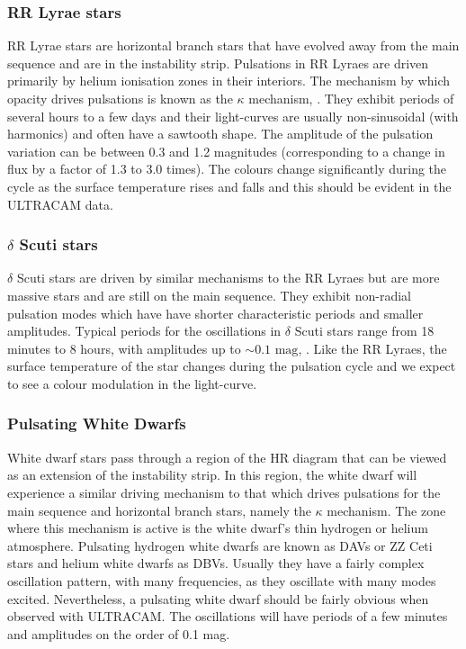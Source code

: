 \subsubsection{RR Lyrae stars}
RR Lyrae stars are horizontal branch stars that have evolved away from the main sequence and are in the instability strip. Pulsations in RR Lyraes are driven primarily by helium ionisation zones in their interiors. The mechanism by which opacity drives pulsations is known as the $\kappa$ mechanism, \citep{asteroseismology}. They exhibit periods of several hours to a few days and their light-curves are usually non-sinusoidal (with harmonics) and often have a sawtooth shape. The amplitude of the pulsation variation can be between 0.3 and 1.2 magnitudes (corresponding to a change in flux by a factor of 1.3 to 3.0 times). The colours change significantly during the cycle as the surface temperature rises and falls and this should be evident in the ULTRACAM data. 

\subsubsection{$\delta$ Scuti stars}
$\delta$ Scuti stars are driven by similar mechanisms to the RR Lyraes but are more massive stars and are still on the main sequence. They exhibit non-radial pulsation modes which have have shorter characteristic periods and smaller amplitudes. Typical periods for the oscillations in $\delta$ Scuti stars range from 18 minutes to 8 hours, with amplitudes up to $\sim \mbox{0.1 mag}$, \citep{KurtzBook}. Like the RR Lyraes, the surface temperature of the star changes during the pulsation cycle and we expect to see a colour modulation in the light-curve. 

\subsubsection{Pulsating White Dwarfs}
White dwarf stars pass through a region of the HR diagram that can be viewed as an extension of the instability strip. In this region, the white dwarf will experience a similar driving mechanism to that which drives pulsations for the main sequence and horizontal branch stars, namely the $\kappa$ mechanism. The zone where this mechanism is active is the white dwarf's thin hydrogen or helium atmosphere. Pulsating hydrogen white dwarfs are known as {DAVs} or {ZZ Ceti} stars and helium white dwarfs as {DBV}s. Usually they have a fairly complex oscillation pattern, with many frequencies, as they oscillate with many modes excited. Nevertheless, a pulsating white dwarf should be fairly obvious when observed with ULTRACAM. The oscillations will have periods of a few minutes and amplitudes on the order of 0.1 mag. 

